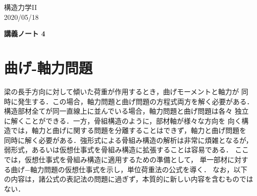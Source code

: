 \documentclass[10pt,a4j]{jarticle}
\newlength{\minitwocolumn}
\begin{document}
\newcommand{\fat}[1]{\mbox{\boldmath $#1$}}
\newcommand{\D}{\partial}
\newcommand{\w}{\omega}
\newcommand{\ga}{\alpha}
\newcommand{\gb}{\beta}
\newcommand{\gx}{\xi}
\newcommand{\gz}{\zeta}
\newcommand{\vhat}[1]{\hat{\fat{#1}}}
\newcommand{\spc}{\vspace{0.7\baselineskip}}
\newcommand{\halfspc}{\vspace{0.3\baselineskip}}

\newcommand{\twofig}[2]
 {
   \begin{figure}
     \begin{minipage}[t]{\minitwocolumn}
         \begin{center}   #1
         \end{center}
     \end{minipage}
         \hspace{\columnsep}
     \begin{minipage}[t]{\minitwocolumn}
         \begin{center} #2
         \end{center}
     \end{minipage}
   \end{figure}
 }
\begin{flushright}
	構造力学II\\
	2020/05/18
\end{flushright}
\begin{center}
	{\LARGE \bf 講義ノート 4} \\
\end{center}
\section{曲げ-軸力問題}
梁の長手方向に対して傾いた荷重が作用するとき，曲げモーメントと軸力が
同時に発生する．この場合，軸力問題と曲げ問題の方程式両方を解く必要がある．
構造部材全てが同一直線上に並んでいる場合，軸力問題と曲げ問題は各々
独立に解くことができる．一方，骨組構造のように，部材軸が様々な方向を
向く構造では，軸力と曲げに関する問題を分離することはできず，軸力と曲げ問題を
同時に解く必要がある．強形式による骨組み構造の解析は非常に煩雑となるが，
弱形式，あるいは仮想仕事式を骨組み構造に拡張することは容易である．
ここでは，仮想仕事式を骨組み構造に適用するための準備として，
単一部材に対する曲げ−軸力問題の仮想仕事式を示し，単位荷重法の公式を導く．
なお，以下の内容は，諸公式の表記法の問題に過ぎず，本質的に新しい内容を含むものではない．
\end{document}
